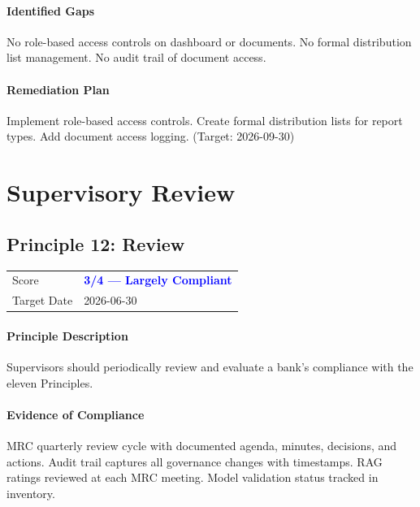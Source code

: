 \documentclass[11pt]{article}
\begin{document}
\paragraph{Identified Gaps}
No role-based access controls on dashboard or documents. No formal distribution list management. No audit trail of document access.

\paragraph{Remediation Plan}
Implement role-based access controls. Create formal distribution lists for report types. Add document access logging. (Target: 2026-09-30)

\clearpage

\section{Supervisory Review}

\subsection{Principle 12: Review}

\begin{table}[H]
    \centering
    \begin{tabular}{ll}
        \toprule
        Score & \textcolor{blue}{\textbf{3/4 --- Largely Compliant}} \\
        Target Date & 2026-06-30 \\
        \bottomrule
    \end{tabular}
\end{table}

\paragraph{Principle Description}
Supervisors should periodically review and evaluate a bank's compliance with the eleven Principles.

\paragraph{Evidence of Compliance}
MRC quarterly review cycle with documented agenda, minutes, decisions, and actions. Audit trail captures all governance changes with timestamps. RAG ratings reviewed at each MRC meeting. Model validation status tracked in inventory.
\end{document}
